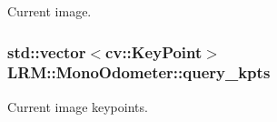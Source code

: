 \-Current image. 

\hypertarget{classLRM_1_1MonoOdometer_a18d64f992353bf50e1421a1cb9ca32f2}{
\subsubsection[{query\-\_\-kpts}]{\setlength{\rightskip}{0pt plus 5cm}std\-::vector$<$cv\-::\-Key\-Point$>$ {\bf \-L\-R\-M\-::\-Mono\-Odometer\-::query\-\_\-kpts}}}\label{classLRM_1_1MonoOdometer_a18d64f992353bf50e1421a1cb9ca32f2}


\-Current image keypoints. 

